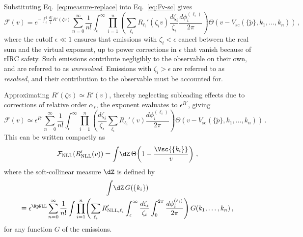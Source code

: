 Substituting Eq.~\eqref{eq:measure-replace} into Eq.~\eqref{eq:Fv-sc} gives
\begin{equation}
  \label{eq:Fv-zeta-reg}
  \mathcal{F}(v) = e^{-\int_{\epsilon}^{1}\frac{d\zeta}{\zeta}R'\left(\zeta v\right)}
  \sum_{n=0}^\infty\frac{1}{n!}
  \int_{\epsilon}^\infty\!\prod_{i=1}^n\left(\sum_{\ell_i}R_{\ell_i}'\left(\zeta_i v\right)\frac{d\zeta_i}{\zeta_i}\frac{d\phi_i^{(\ell_i)}}{2\pi}\right)
  \Theta\!\left(v-V_{\mathrm{sc}}\!\left(\{\tilde{p}\},k_1,\dots,k_n\right)\right)\,,
\end{equation}
where the cutoff $\epsilon\ll 1$ ensures that emissions with
$\zeta_i<\epsilon$ cancel between the real sum and the virtual exponent,
up to power corrections in $\epsilon$ that vanish because of rIRC
safety. Such emissions contribute negligibly to the observable on their
own, and are referred to as \emph{unresolved}. Emissions with
$\zeta_i>\epsilon$ are referred to as \emph{resolved}, and their
contribution to the observable must be accounted for.

Approximating $R'(\zeta v) \simeq R'(v)$, thereby neglecting subleading effects due to corrections of relative order $\alpha_s$, 
the exponent evaluates to $\epsilon^{R'}$, giving
\begin{equation}
\label{eq:Fv-reg-approx}
    \mathcal{F}(v)
    \simeq \epsilon^{R'}
      \sum_{n=0}^\infty\frac{1}{n!}
      \int_{\epsilon}^\infty\!
      \prod_{i=1}^n\!\left(
        \frac{d\zeta_i}{\zeta_i}
        \sum_{\ell_i}R_{\ell_i}'(v)
        \frac{d\phi_i^{(\ell_i)}}{2\pi}
      \right)
      \Theta\!\left(v-V_{\mathrm{sc}}\!\left(
        \{\tilde{p}\},k_1,\dots,k_n\right)\right)\,.
\end{equation}
This can be written compactly as
\begin{equation}
    \label{eq:FNLL-formula}
    \mathcal{F}_{\mathrm{NLL}}\!\left(R'_{\mathrm{NLL}}(v)\right)
    = \int\!\dZ\,\Theta\!\left(1-\frac{\Vsc{\{k_i\}}}{v}\right)\,,
\end{equation}
where the soft-collinear measure $\dZ$ is defined by
\begin{multline}
    \label{eq:dZ-def}
    \int\!\dZ\,G(\{k_i\}) \\
    \equiv \epsilon^{\RpNLL}\sum_{n=0}^\infty\frac{1}{n!}
    \int\prod_{i=1}^n\!\left(\sum_{\ell_i}R'_{\mathrm{NLL},\ell_i}
    \int_{\epsilon}^\infty\frac{d\zeta_i}{\zeta_i}
    \int_0^{2\pi}\frac{d\phi_i^{(\ell_i)}}{2\pi}\right)
    G(k_1,\dots,k_n)\,,
\end{multline}
for any function $G$ of the emissions. 

